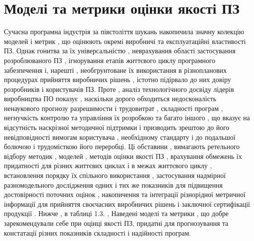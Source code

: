 \documentclass[oneside,final,14pt]{extreport}
\begin{document}
\section{Моделі та метрики оцінки якості ПЗ}
\label{2section:id6}
Сучасна програмна індустрія за півстоліття шукань накопичила значну колекцію моделей і метрик , що оцінюють окремі виробничі та експлуатаційні властивості ПЗ. Однак гонитва за їх універсальністю , неврахування області застосування розроблюваного ПЗ , ігнорування етапів життєвого циклу програмного забезпечення і, нарешті , необгрунтоване їх використання в різнопланових процедурах прийняття виробничих рішень , істотно підірвало до них довіру розробників і користувачів ПЗ.
Проте , аналіз технологічного досвіду лідерів виробництва ПО показує , наскільки дорого обходиться недосконалість ненаукового прогнозу разрешимости і трудовитрат , складності програм , негнучкість контролю та управління їх розробкою та багато іншого , що вказує на відсутність наскрізної методичної підтримки і призводить зрештою до його невідповідності вимогам користувача , необхідному стандарту і до подальшої болючою і трудомісткою його переробці. Ці обставини , вимагають ретельного відбору методик , моделей , методів оцінки якості ПЗ , врахування обмежень їх придатності для різних життєвих циклах і в межах життєвого циклу , встановлення порядку їх спільного використання , застосування надмірної разномодельного дослідження одних і тих же показників для підвищення достовірності поточних оцінок , накопичення та інтеграції різнорідної метричної інформації для прийняття своєчасних виробничих рішень і заключної сертифікації продукції . Нижче , в таблиці 1.3. , Наведені моделі та метрики , що добре зарекомендували себе при оцінці якості ПЗ, придатні для прогнозування та констатації різних показників складності і надійності програм.
\end{document}

